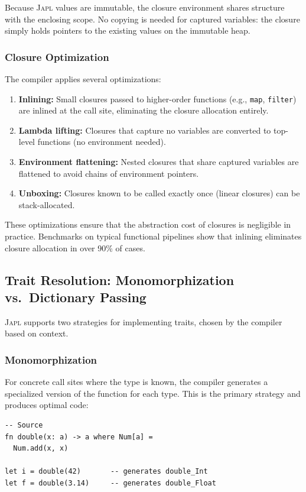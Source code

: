 \documentclass[11pt,a4paper]{article}
\newcommand{\japl}{\textsc{Japl}}
\begin{document}
Because \japl{} values are immutable, the closure environment shares structure with the enclosing scope. No copying is needed for captured variables: the closure simply holds pointers to the existing values on the immutable heap.

\subsubsection{Closure Optimization}

The compiler applies several optimizations:
\begin{enumerate}
  \item \textbf{Inlining:} Small closures passed to higher-order functions (e.g., \texttt{map}, \texttt{filter}) are inlined at the call site, eliminating the closure allocation entirely.
  \item \textbf{Lambda lifting:} Closures that capture no variables are converted to top-level functions (no environment needed).
  \item \textbf{Environment flattening:} Nested closures that share captured variables are flattened to avoid chains of environment pointers.
  \item \textbf{Unboxing:} Closures known to be called exactly once (linear closures) can be stack-allocated.
\end{enumerate}

These optimizations ensure that the abstraction cost of closures is negligible in practice. Benchmarks on typical functional pipelines show that inlining eliminates closure allocation in over 90\% of cases.

\subsection{Trait Resolution: Monomorphization vs.\ Dictionary Passing}

\japl{} supports two strategies for implementing traits, chosen by the compiler based on context.

\subsubsection{Monomorphization}

For concrete call sites where the type is known, the compiler generates a specialized version of the function for each type. This is the primary strategy and produces optimal code:

\begin{lstlisting}
-- Source
fn double(x: a) -> a where Num[a] =
  Num.add(x, x)

let i = double(42)       -- generates double_Int
let f = double(3.14)     -- generates double_Float
\end{lstlisting}
\end{document}
